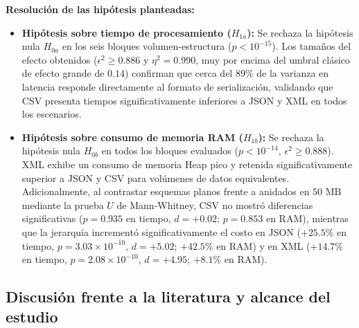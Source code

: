 \textbf{Resolución de las hipótesis planteadas:}
\begin{itemize}
    \item \textbf{Hipótesis sobre tiempo de procesamiento ($H_{1a}$):} Se rechaza la hipótesis nula $H_{0a}$ en los seis bloques volumen-estructura ($p < 10^{-15}$). Los tamaños del efecto obtenidos ($\epsilon^{2} \ge 0.886$ y $\eta^{2} = 0.990$, muy por encima del umbral clásico de efecto grande de $0.14$) confirman que cerca del $89\%$ de la varianza en latencia responde directamente al formato de serialización, validando que CSV presenta tiempos significativamente inferiores a JSON y XML en todos los escenarios.
    \item \textbf{Hipótesis sobre consumo de memoria RAM ($H_{1b}$):} Se rechaza la hipótesis nula $H_{0b}$ en todos los bloques evaluados ($p < 10^{-14}$, $\epsilon^{2} \ge 0.888$). XML exhibe un consumo de memoria Heap pico y retenida significativamente superior a JSON y CSV para volúmenes de datos equivalentes. Adicionalmente, al contrastar esquemas planos frente a anidados en $50\text{ MB}$ mediante la prueba $U$ de Mann-Whitney, CSV no mostró diferencias significativas ($p = 0.935$ en tiempo, $d = +0.02$; $p = 0.853$ en RAM), mientras que la jerarquía incrementó significativamente el costo en JSON ($+25.5\%$ en tiempo, $p = 3.03 \times 10^{-10}$, $d = +5.02$; $+42.5\%$ en RAM) y en XML ($+14.7\%$ en tiempo, $p = 2.08 \times 10^{-10}$, $d = +4.95$; $+8.1\%$ en RAM).
\end{itemize}

\subsection{Discusión frente a la literatura y alcance del estudio}

